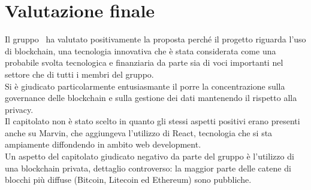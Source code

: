 \documentclass[StudioDiFattibilità.tex]{subfiles}
\begin{document}
\section{Valutazione finale}
Il gruppo \gruppo\ ha valutato positivamente la proposta perché il progetto riguarda l'uso di blockchain, una tecnologia innovativa che è stata considerata come una probabile svolta tecnologica e finanziaria da parte sia di voci importanti nel settore che di tutti i membri del gruppo.\\
Si è giudicato particolarmente entusiasmante il porre la concentrazione sulla governance delle blockchain e sulla gestione dei dati mantenendo il rispetto alla privacy.\\
Il capitolato non è stato scelto in quanto gli stessi aspetti positivi erano presenti anche su Marvin, che aggiungeva l'utilizzo di React, tecnologia che si sta ampiamente diffondendo in ambito web development.\\
Un aspetto del capitolato giudicato negativo da parte del gruppo è l'utilizzo di una blockchain privata, dettaglio controverso: la maggior parte delle catene di blocchi più diffuse (Bitcoin, Litecoin ed Ethereum) sono pubbliche.
\end{document}
